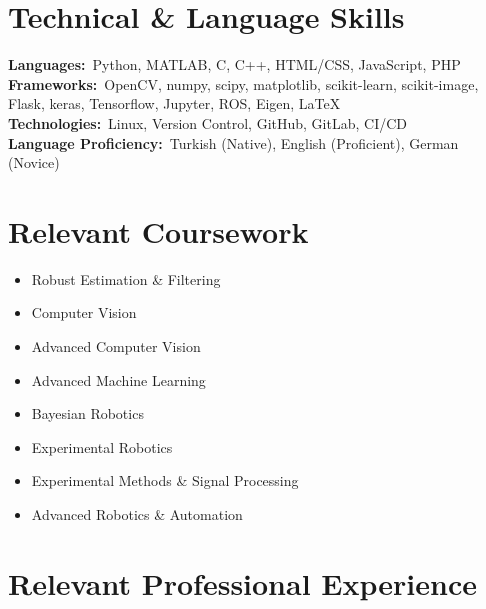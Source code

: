 \documentclass[letterpaper,11pt]{article}
\begin{document}
\section{Technical \& Language Skills}
 \begin{itemize}[leftmargin=0.15in, label={}]
    \small{\item{
     \textbf{Languages:}{~Python, MATLAB, C, C++, HTML/CSS, JavaScript, PHP} \\
	 \textbf{Frameworks:}{~OpenCV, numpy, scipy, matplotlib, scikit-learn, scikit-image, Flask, keras, Tensorflow, Jupyter, ROS, Eigen, \LaTeX} \\
     \textbf{Technologies:}{~Linux, Version Control, GitHub, GitLab, CI/CD} \\
	 \textbf{Language Proficiency:}{~Turkish (Native), English (Proficient), German (Novice)}
    }}
 \end{itemize}
 \vspace{-16pt}

%
\section{Relevant Coursework}
	\begin{multicols}{3}
		\begin{itemize}[itemsep=-5pt, parsep=3pt]
			\item\small Robust Estimation \& Filtering
			\item Computer Vision
			\item Advanced Computer Vision
			\item Advanced Machine Learning
			\item Bayesian Robotics
			\item Experimental Robotics
			\item Experimental Methods \& Signal Processing
			\item Advanced Robotics \& Automation
		\end{itemize}
	\end{multicols}
	\vspace*{2.0\multicolsep}

\section{Relevant Professional Experience}
  \resumeSubHeadingListStart
\end{document}
